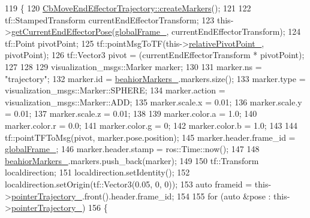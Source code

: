 \begin{DoxyCode}
119     \{
120         \hyperlink{classcl__move__group__interface_1_1CbMoveEndEffectorTrajectory_a442efa1d5bc9e9a16f74ecd31b13d9b5}{CbMoveEndEffectorTrajectory::createMarkers}();
121 
122         tf::StampedTransform currentEndEffectorTransform;
123         this->\hyperlink{classcl__move__group__interface_1_1CbMoveEndEffectorTrajectory_a56945ccfff51e3eb9ec9c2edcfa132af}{getCurrentEndEffectorPose}(\hyperlink{classcl__move__group__interface_1_1CbCircularPouringMotion_a1d54253dc370bce8dd413e08b4bf8c43}{globalFrame\_}, 
      currentEndEffectorTransform);
124         tf::Point pivotPoint;
125         tf::pointMsgToTF(this->\hyperlink{classcl__move__group__interface_1_1CbCircularPouringMotion_a686d15e252dc8e503985e97014690cc6}{relativePivotPoint\_}, pivotPoint);
126         tf::Vector3 pivot = (currentEndEffectorTransform * pivotPoint);
127 
128 
129         visualization\_msgs::Marker marker;
130 
131         marker.ns = \textcolor{stringliteral}{"trajectory"};
132         marker.id = \hyperlink{classcl__move__group__interface_1_1CbMoveEndEffectorTrajectory_a809fb5385adf27c0a1c8f8136566949c}{beahiorMarkers\_}.markers.size();
133         marker.type = visualization\_msgs::Marker::SPHERE;
134         marker.action = visualization\_msgs::Marker::ADD;
135         marker.scale.x = 0.01;
136         marker.scale.y = 0.01;
137         marker.scale.z = 0.01;
138 
139         marker.color.a = 1.0;
140         marker.color.r = 0.0;
141         marker.color.g = 0;
142         marker.color.b = 1.0;
143 
144         tf::pointTFToMsg(pivot, marker.pose.position);
145         marker.header.frame\_id = \hyperlink{classcl__move__group__interface_1_1CbCircularPouringMotion_a1d54253dc370bce8dd413e08b4bf8c43}{globalFrame\_};
146         marker.header.stamp = ros::Time::now();
147 
148         \hyperlink{classcl__move__group__interface_1_1CbMoveEndEffectorTrajectory_a809fb5385adf27c0a1c8f8136566949c}{beahiorMarkers\_}.markers.push\_back(marker);
149  
150         tf::Transform localdirection;
151         localdirection.setIdentity();
152         localdirection.setOrigin(tf::Vector3(0.05, 0, 0));
153         \textcolor{keyword}{auto} frameid = this->\hyperlink{classcl__move__group__interface_1_1CbCircularPouringMotion_a6f53442c47cf9280d8be72ea1c35546f}{pointerTrajectory\_}.front().header.frame\_id;
154 
155         \textcolor{keywordflow}{for} (\textcolor{keyword}{auto} &pose : this->\hyperlink{classcl__move__group__interface_1_1CbCircularPouringMotion_a6f53442c47cf9280d8be72ea1c35546f}{pointerTrajectory\_})
156         \{

\end{DoxyCode}
